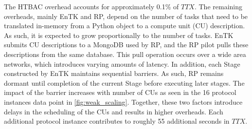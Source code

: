 The HTBAC overhead accounts for approximately 0.1\% of \(TTX\). The remaining
overheads, mainly EnTK and RP, depend on the number of tasks that need to be
translated in-memory from a Python object to a compute unit (CU) description.
As such, it is expected to grow proportionally to the number of tasks. EnTK
submits CU descriptions to a MongoDB used by RP, and the RP pilot pulls these
descriptions from the same database. This pull operation occurs over a wide
area networks, which introduces varying amounts of latency. In addition, each
Stage constructed by EnTK maintains sequential barriers. As such, RP remains
dormant until completion of the current Stage before executing later stages.
The impact of the barrier increases with number of CUs as seen in the 16
protocol instances data point in \ref{fig:weak_scaling}. Together, these two
factors introduce delays in the scheduling of the CUs and results in higher
overheads. Each additional protocol instance contributes to roughly 55
additional seconds in \(TTX\).

















